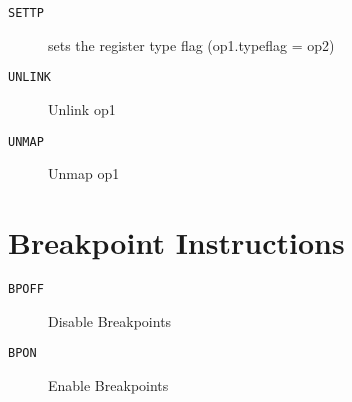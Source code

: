 
\begin{description}
\item[\texttt{SETTP      }]  sets the register type flag (op1.typeflag = op2)\\
\end{description}

\begin{description}
\item[\texttt{UNLINK     }]  Unlink op1\\
\end{description}

\begin{description}
\item[\texttt{UNMAP      }]  Unmap op1\\
\end{description}

\section{Breakpoint Instructions}
\begin{description}
\item[\texttt{BPOFF      }]  Disable Breakpoints\\
\end{description}

\begin{description}
\item[\texttt{BPON       }]  Enable Breakpoints\\
\end{description}

